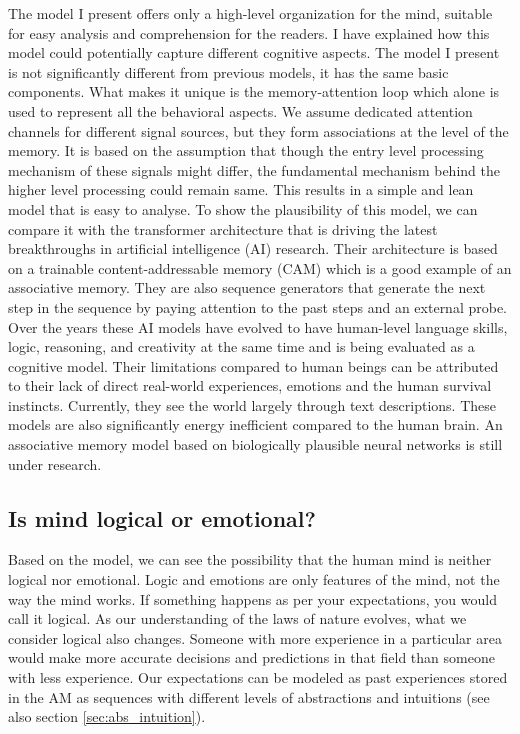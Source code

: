 \documentclass[reprint,amsmath,amssymb,apr,aip,onecolumn, 11pt]{revtex4-1}
\begin{document}
The model I present offers only a high-level organization for the mind, suitable for easy analysis and comprehension for the readers. I have explained how this model could potentially capture different cognitive aspects. The model I present is not significantly different from previous models, it has the same basic components. What makes it unique is the memory-attention loop which alone is used to represent all the behavioral aspects. We assume dedicated attention channels for different signal sources, but they form associations at the level of the memory. It is based on the assumption that though the entry level processing mechanism of these signals might differ, the fundamental mechanism behind the higher level processing could remain same. This results in a simple and lean model that is easy to analyse.  To show the plausibility of this model, we can compare it with the transformer architecture that is driving the latest breakthroughs in artificial intelligence (AI) research\cite{Vaswani2017_attentionIsAllYouNeed, niu2024largelanguagemodelscognitive}. Their architecture is based on a trainable content-addressable memory (CAM) which is a good example of an associative memory. They are also sequence generators that generate the next step in the sequence by paying attention to the past steps and an external probe. Over the years these AI models have evolved to have human-level language skills, logic, reasoning, and creativity at the same time and is being evaluated as a cognitive model\cite{niu2024largelanguagemodelscognitive}. Their limitations compared to human beings can be attributed to their lack of direct real-world experiences, emotions and the human survival instincts. Currently, they see the world largely through text descriptions. These models are also significantly energy inefficient compared to the human brain. An associative memory model based on biologically plausible neural networks is still under research. 

\subsection{Is mind logical or emotional?}
Based on the model, we can see the possibility that the human mind is neither logical nor emotional. Logic and emotions are only features of the mind, not the way the mind works. If something happens as per your expectations, you would call it logical. As our understanding of the laws of nature evolves, what we consider logical also changes. Someone with more experience in a particular area would make more accurate decisions and predictions in that field than someone with less experience. Our expectations can be modeled as past experiences stored in the AM as sequences with different levels of abstractions and intuitions (see also section \ref{sec:abs_intuition}). 
\end{document}
